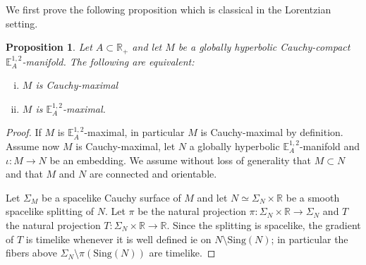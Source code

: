 \documentclass[a4paper,12pt]{article}
\def\R{\mathbb{R}}
\def\sing{\mathrm{Sing}}
\def\RR{\mathbb{R}}
\newcommand{\mass}[1]{{\mathbb E}^{1,2}_{#1}}
\newtheorem{propou}[lemou]{Proposition}
\begin{document}
We first prove the following proposition which is classical in the Lorentzian setting.
\begin{propou}\label{prop:cauchy_abs_max}Let $A\subset \RR_+$ and let $M$ be a globally hyperbolic Cauchy-compact  $\mass{A}$-manifold. The following are equivalent:
\begin{enumerate}[(i)]
\item $M$ is Cauchy-maximal  \item $M$ is $\mass{A}$-maximal.
\end{enumerate}

\end{propou}
\begin{proof} 
If $M$ is $\mass{A}$-maximal, in particular  $M$ is Cauchy-maximal by definition. 
Assume now $M$ is Cauchy-maximal, let $N$ a globally hyperbolic $\mass{A}$-manifold and  $\iota:M\rightarrow N$ be an embedding. We assume  without loss of generality that $M\subset N$ and that $M$ and $N$ are connected and orientable.

Let $\Sigma_M$ be a spacelike Cauchy surface of $M$  and let $N \simeq \Sigma_N\times \RR$ be a smooth spacelike splitting of $N$. Let $\pi$ be the natural projection $\pi:\Sigma_N\times \RR\rightarrow \Sigma_N$ and $T$ the natural projection $T:\Sigma_N\times \RR\rightarrow \R$. Since the splitting is spacelike, the gradient of $T$ is timelike whenever it is well defined ie on $N\setminus \sing(N)$; in particular the fibers above $\Sigma_N\setminus \pi(\sing(N))$ are timelike.


\end{proof}
\end{document}
